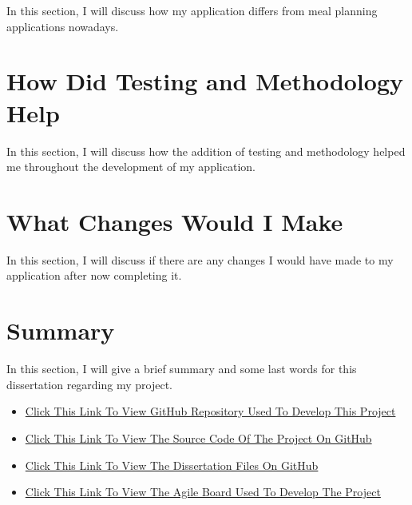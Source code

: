 In this section, I will discuss how my application differs from meal planning applications nowadays.

\section{How Did Testing and Methodology Help}

In this section, I will discuss how the addition of testing and methodology helped me throughout the development of my application.

\section{What Changes Would I Make}

In this section, I will discuss if there are any changes I would have made to my application after now completing it.

\section{Summary}

In this section, I will give a brief summary and some last words for this dissertation regarding my project.

\begin{appendices}
\begin{itemize}
\item \href{https://github.com/Emmanuel-Osabuehien/AppliedProjectMinorDissertation}{Click This Link To View GitHub Repository Used To Develop This Project}
\item \href{https://github.com/Emmanuel-Osabuehien/AppliedProjectMinorDissertation/tree/main/meal-planning-system}{Click This Link To View The Source Code Of The Project On GitHub}
\item \href{https://github.com/Emmanuel-Osabuehien/AppliedProjectMinorDissertation/tree/main/dissertation}{Click This Link To View The Dissertation Files On GitHub}
\item \href{https://g00373559.atlassian.net/jira/software/projects/MPRO/boards/4}{Click This Link To View The Agile Board Used To Develop The Project}
\end{itemize}
\end{appendices}
